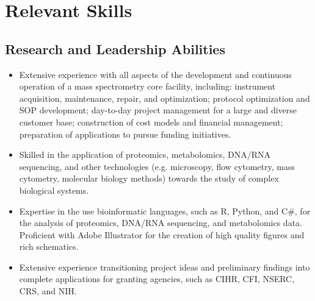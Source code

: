 \documentclass[11pt]{article}
\begin{document}
\section*{Relevant Skills}
\begin{addmargin}[3em]{2em}%
	\subsection*{Research and Leadership Abilities}
	\begin{itemize}
		\item Extensive experience with all aspects of the development and continuous operation of a mass spectrometry core facility, including: instrument acquisition, maintenance, repair, and optimization; protocol optimization and SOP development; day-to-day project management for a large and diverse customer base; construction of cost models and financial management; preparation of applications to pursue funding initiatives. 
        \item Skilled in the application of proteomics, metabolomics, DNA/RNA sequencing, and other technologies (e.g. microscopy, flow cytometry, mass cytometry, molecular biology methods) towards the study of complex biological systems.
        \item Expertise in the use bioinformatic languages, such as R, Python, and C\#, for the analysis of proteomics, DNA/RNA sequencing, and metabolomics data. Proficient with Adobe Illustrator for the creation of high quality figures and rich schematics.
        \item Extensive experience transitioning project ideas and preliminary findings into complete applications for granting agencies, such as CIHR, CFI, NSERC, CRS, and NIH.		
	\end{itemize}
\end{addmargin}
\end{document}
